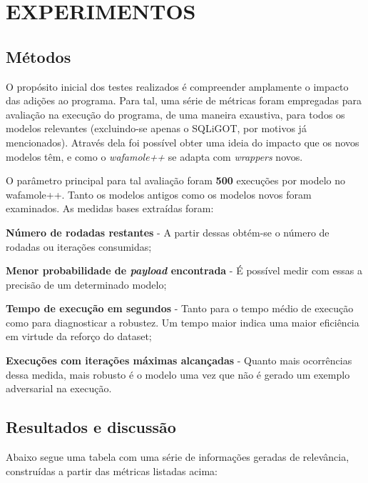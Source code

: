 \chapter{EXPERIMENTOS}
\label{chp:capitulo5}

\section{Métodos}
O propósito inicial dos testes realizados é compreender amplamente o impacto das adições ao programa. Para tal, uma série de métricas foram empregadas para avaliação na execução do programa, de uma maneira exaustiva, para todos os modelos relevantes (excluindo-se apenas o SQLiGOT, por motivos já mencionados). Através dela foi possível obter uma ideia do impacto que os novos modelos têm, e como o \textit{wafamole++} se adapta com \textit{wrappers} novos.

O parâmetro principal para tal avaliação foram \textbf{500} execuções por modelo no wafamole++. Tanto os modelos antigos como os modelos novos foram examinados. As medidas bases extraídas foram:
\begin{alineas}
\item \textbf{Número de rodadas restantes} - A partir dessas obtém-se o número de rodadas ou iterações consumidas;
\item \textbf{Menor probabilidade de \textit{payload} encontrada} - É possível medir com essas a precisão de um determinado modelo;
\item \textbf{Tempo de execução em segundos} - Tanto para o tempo médio de execução como para diagnosticar a robustez. Um tempo maior indica uma maior eficiência em virtude da reforço do dataset;
\item \textbf{Execuções com iterações máximas alcançadas} - Quanto mais ocorrências dessa medida, mais robusto é o modelo uma vez que não é gerado um exemplo adversarial na execução.
\end{alineas}

\bigskip 

\section{Resultados e discussão}

Abaixo segue uma tabela com uma série de informações geradas de relevância, construídas a partir das métricas listadas acima: 

